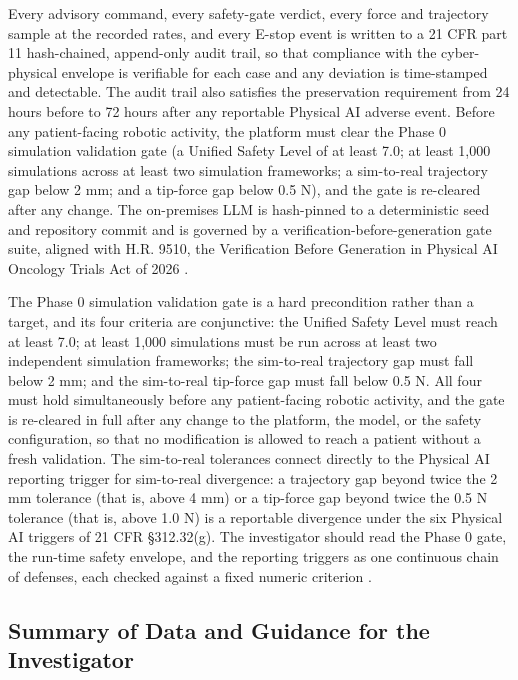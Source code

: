 Every advisory command, every safety-gate verdict, every force and trajectory
sample at the recorded rates, and every E-stop event is written to a 21 CFR part 11
hash-chained, append-only audit trail, so that compliance with the cyber-physical
envelope is verifiable for each case and any deviation is time-stamped and
detectable. The audit trail also satisfies the preservation requirement from 24
hours before to 72 hours after any reportable Physical AI adverse event. Before any
patient-facing robotic activity, the platform must clear the Phase 0 simulation
validation gate (a Unified Safety Level of at least 7.0; at least 1,000 simulations
across at least two simulation frameworks; a sim-to-real trajectory gap below 2 mm;
and a tip-force gap below 0.5 N), and the gate is re-cleared after any change. The
on-premises LLM is hash-pinned to a deterministic seed and repository commit and is
governed by a verification-before-generation gate suite, aligned with H.R. 9510,
the Verification Before Generation in Physical AI Oncology Trials Act of 2026
\cite{congress9510,clintrustpai,paiautospons}.

The Phase 0 simulation validation gate is a hard precondition rather than a target,
and its four criteria are conjunctive: the Unified Safety Level must reach at least
7.0; at least 1,000 simulations must be run across at least two independent
simulation frameworks; the sim-to-real trajectory gap must fall below 2 mm; and the
sim-to-real tip-force gap must fall below 0.5 N. All four must hold simultaneously
before any patient-facing robotic activity, and the gate is re-cleared in full after
any change to the platform, the model, or the safety configuration, so that no
modification is allowed to reach a patient without a fresh validation. The
sim-to-real tolerances connect directly to the Physical AI reporting trigger for
sim-to-real divergence: a trajectory gap beyond twice the 2 mm tolerance (that is,
above 4 mm) or a tip-force gap beyond twice the 0.5 N tolerance (that is, above
1.0 N) is a reportable divergence under the six Physical AI triggers of 21 CFR
\S 312.32(g). The investigator should read the Phase 0 gate, the run-time safety
envelope, and the reporting triggers as one continuous chain of defenses, each
checked against a fixed numeric criterion \cite{congress9510,clintrustpai}.

\subsection*{Summary of Data and Guidance for the Investigator}

